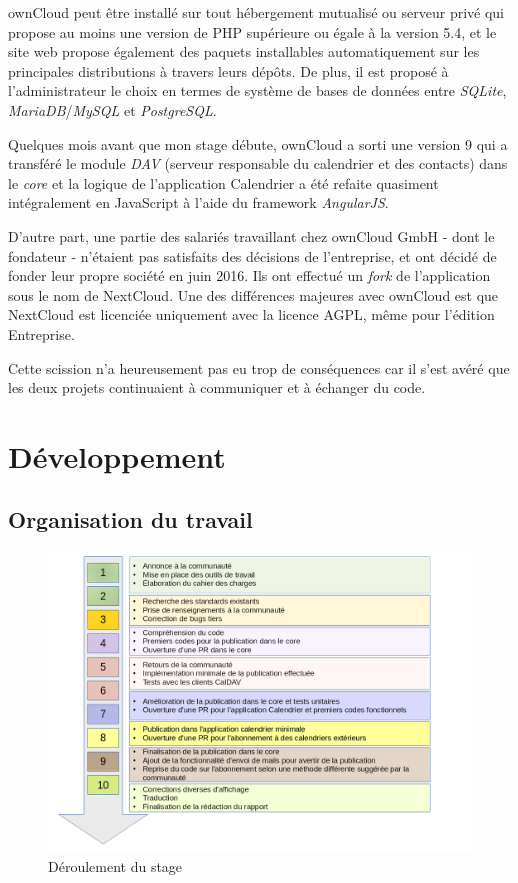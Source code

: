 \documentclass[10pt,a4paper, twoside]{report}
\begin{document}
	ownCloud peut être installé sur tout hébergement mutualisé ou serveur privé qui propose au moins une version de PHP supérieure ou égale à la version 5.4, et le site web propose également des paquets installables automatiquement sur les principales distributions à travers leurs dépôts. De plus, il est proposé à l'administrateur le choix en termes de système de bases de données entre \textit{SQLite}, \textit{MariaDB}/\textit{MySQL} et \textit{PostgreSQL}.
	
	Quelques mois avant que mon stage débute, ownCloud a sorti une version 9 qui a transféré le module \textit{DAV} (serveur responsable du calendrier et des contacts) dans le \textit{core} et la logique de l'application Calendrier a été refaite quasiment intégralement en JavaScript à l'aide du framework \textit{AngularJS}.
	
	D'autre part, une partie des salariés travaillant chez ownCloud GmbH - dont le fondateur - n'étaient pas satisfaits des décisions de l'entreprise, et ont décidé de fonder leur propre société en juin 2016. Ils ont effectué un \textit{fork} de l'application sous le nom de NextCloud. Une des différences majeures avec ownCloud est que NextCloud est licenciée uniquement avec la licence AGPL, même pour l'édition Entreprise. 
	
	Cette scission n'a heureusement pas eu trop de conséquences car il s'est avéré que les deux projets continuaient à communiquer et à échanger du code.
	
	\chapter{Développement}
	\section{Organisation du travail}
	\begin{figure}[ht]
		\centering
		\centerline{\includegraphics[width=1.45\textwidth]{images/deroulement.png}}
		\caption*{Déroulement du stage}
		\label{normal_case}
	\end{figure}
	
\end{document}
